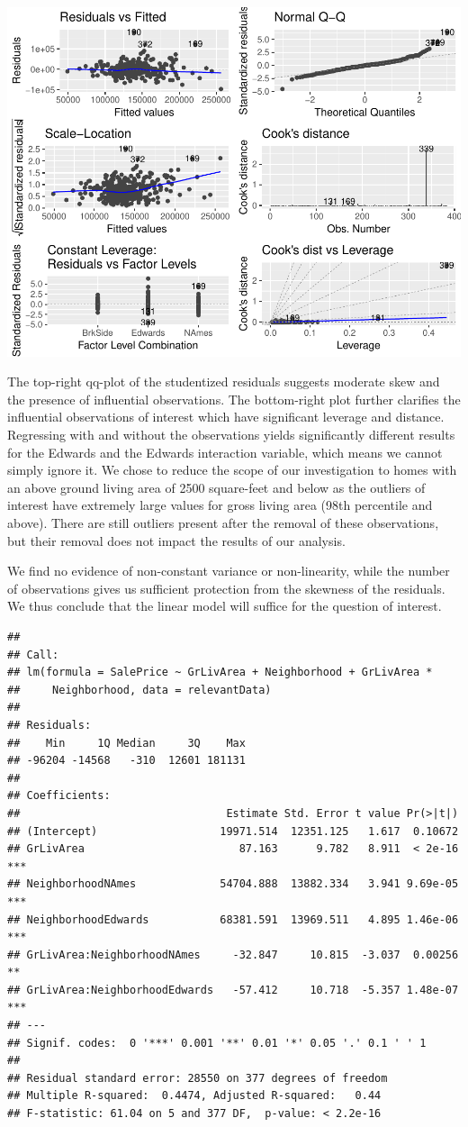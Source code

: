 \documentclass[american,]{article}
\begin{document}
\includegraphics{HousePricesPaper_files/figure-latex/residualplot-1.pdf}

The top-right qq-plot of the studentized residuals suggests moderate
skew and the presence of influential observations. The bottom-right plot
further clarifies the influential observations of interest which have
significant leverage and distance. Regressing with and without the
observations yields significantly different results for the Edwards and
the Edwards interaction variable, which means we cannot simply ignore
it. We chose to reduce the scope of our investigation to homes with an
above ground living area of 2500 square-feet and below as the outliers
of interest have extremely large values for gross living area (98th
percentile and above). There are still outliers present after the
removal of these observations, but their removal does not impact the
results of our analysis.

We find no evidence of non-constant variance or non-linearity, while the
number of observations gives us sufficient protection from the skewness
of the residuals. We thus conclude that the linear model will suffice
for the question of interest.

\begin{verbatim}
## 
## Call:
## lm(formula = SalePrice ~ GrLivArea + Neighborhood + GrLivArea * 
##     Neighborhood, data = relevantData)
## 
## Residuals:
##    Min     1Q Median     3Q    Max 
## -96204 -14568   -310  12601 181131 
## 
## Coefficients:
##                                Estimate Std. Error t value Pr(>|t|)    
## (Intercept)                   19971.514  12351.125   1.617  0.10672    
## GrLivArea                        87.163      9.782   8.911  < 2e-16 ***
## NeighborhoodNAmes             54704.888  13882.334   3.941 9.69e-05 ***
## NeighborhoodEdwards           68381.591  13969.511   4.895 1.46e-06 ***
## GrLivArea:NeighborhoodNAmes     -32.847     10.815  -3.037  0.00256 ** 
## GrLivArea:NeighborhoodEdwards   -57.412     10.718  -5.357 1.48e-07 ***
## ---
## Signif. codes:  0 '***' 0.001 '**' 0.01 '*' 0.05 '.' 0.1 ' ' 1
## 
## Residual standard error: 28550 on 377 degrees of freedom
## Multiple R-squared:  0.4474, Adjusted R-squared:   0.44 
## F-statistic: 61.04 on 5 and 377 DF,  p-value: < 2.2e-16
\end{verbatim}
\end{document}
